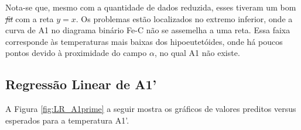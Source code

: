 \documentclass[brazil,tf,epusp]{usp}  %
\providecommand{\DIFadd}[1]{{\protect\color{blue}\uwave{#1}}} %
\providecommand{\DIFdel}[1]{{\protect\color{red}\sout{#1}}}                      %
\providecommand{\DIFaddbegin}{} %
\providecommand{\DIFaddend}{} %
\providecommand{\DIFdelbegin}{} %
\providecommand{\DIFdelend}{} %
\begin{document}
Nota-se que, mesmo com a quantidade de dados reduzida, esses tiveram um bom \DIFdelbegin \textit{\DIFdel{fit}} %
\DIFdelend \DIFaddbegin \DIFadd{ajuste }\DIFaddend com a reta $y = x$. Os problemas estão localizados no extremo inferior, onde a curva de A1 no diagrama binário Fe-C não se assemelha a uma reta. Essa faixa corresponde às temperaturas mais baixas dos hipoeutetóides, onde há poucos pontos devido à proximidade do campo $\alpha$, no qual A1 não existe.

\subsection{Regressão Linear de A1'}

A Figura \ref{fig:LR_A1prime} a seguir mostra os gráficos de valores preditos versus esperados para a temperatura A1'.
\end{document}
